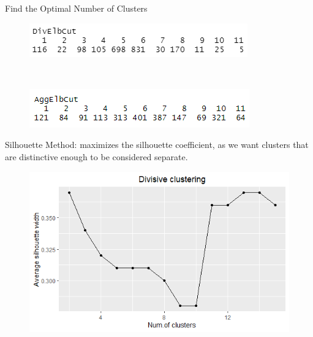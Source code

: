 \documentclass[11pt]{beamer}
\begin{document}
\begin{frame}{Find the Optimal Number of Clusters}
\begin{figure}[!htb]
   \begin{minipage}{0.48\textwidth}
     \centering
     \includegraphics[width=1\linewidth]{images/divcut.png}
     \label{Fig:skew1}
   \end{minipage}\hfill
   \\
   \begin{minipage}{0.48\textwidth}
     \centering
     \includegraphics[width=1\linewidth]{images/aggcut.png}
     \label{Fig:skew2}
   \end{minipage}
\end{figure}
Silhouette Method: maximizes the silhouette coefficient, as we want clusters that are distinctive enough to be considered separate.
\begin{figure}[!htb]
   \begin{minipage}{0.48\textwidth}
     \centering
     \includegraphics[width=1\linewidth]{images/sil_for_dis.png}
     \label{Fig:skew1}
   \end{minipage}\hfill
   \begin{minipage}{0.48\textwidth}
     \centering

\end{minipage}
\end{figure}
\end{frame}
\end{document}
